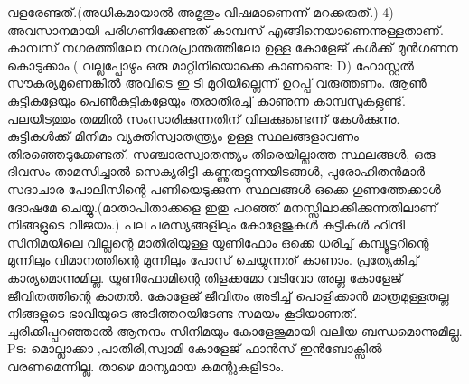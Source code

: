 \documentclass[10pt,a4paper]{report}
\begin{document}
വളരേണ്ടത്.(അധികമായാൽ അമൃതും വിഷമാണെന്ന് മറക്കരുത്.) 4) അവസാനമായി പരിഗണിക്കേണ്ടത് കാമ്പസ് എങ്ങിനെയാണെന്നുള്ളതാണ്. കാമ്പസ് നഗരത്തിലോ നഗരപ്രാന്തത്തിലോ ഉള്ള കോളേജ് കൾക്ക് മുൻഗണന കൊടുക്കാം ( വല്ലപ്പോഴും ഒരു മാറ്റിനിയൊക്കെ കാണണ്ടെ: D) ഹോസ്റ്റൽ സൗകര്യമുണെങ്കിൽ അവിടെ ഇ ടി മുറിയില്ലെന്ന് ഉറപ്പ് വരുത്തണം. ആൺ കുട്ടികളേയും പെൺകുട്ടികളേയും തരാതിരച്ച് കാണുന്ന കാമ്പസുകളുണ്ട്. പലയിടത്തും തമ്മിൽ സംസാരിക്കുന്നതിന് വിലക്കുണ്ടെന്ന് കേൾക്കുന്നു. കുട്ടികൾക്ക് മിനിമം വ്യക്തിസ്വാതന്ത്ര്യം ഉള്ള സ്ഥലങ്ങളാവണം തിരഞ്ഞെടുക്കേണ്ടത്. സഞ്ചാരസ്വാതന്ത്യം തിരെയില്ലാത്ത സ്ഥലങ്ങൾ, ഒരു ദിവസം താമസിച്ചാൽ സെക്യരിട്ടി കണ്ണുരുട്ടുന്നയിടങ്ങൾ, പുരോഹിതൻമാർ സദാചാര പോലിസിന്റെ പണിയെടുക്കുന്ന സ്ഥലങ്ങൾ ഒക്കെ ഗുണത്തേക്കാൾ ദോഷമേ ചെയ്യു.(മാതാപിതാക്കളെ ഇതു പറഞ്ഞ് മനസ്സിലാക്കിക്കുന്നതിലാണ് നിങ്ങളുടെ വിജയം.) പല പരസ്യങ്ങളിലും കോളേജുകൾ കുട്ടികൾ ഹിന്ദി സിനിമയിലെ വില്ലന്റെ മാതിരിയുള്ള യൂണിഫോം ഒക്കെ ധരിച്ച് കമ്പ്യൂട്ടറിന്റെ മുന്നിലും വിമാനത്തിന്റെ മുന്നിലും പോസ് ചെയ്യുന്നത് കാണാം. പ്രത്യേകിച്ച് കാര്യമൊന്നുമില്ല. യൂണിഫോമിന്റെ തിളക്കമോ വടിവോ അല്ല കോളേജ് ജീവിതത്തിന്റെ കാതൽ. കോളേജ് ജീവിതം അടിച്ച് പൊളിക്കാൻ മാത്രമുള്ളതല്ല നിങ്ങളുടെ ഭാവിയുടെ അടിത്തറയിടേണ്ട സമയം കൂടിയാണത്. ചുരിക്കിപ്പറഞ്ഞാൽ ആനന്ദം സിനിമയും കോളേജുമായി വലിയ ബന്ധമൊന്നുമില്ല. Pട: മൊല്ലാക്കാ ,പാതിരി,സ്വാമി കോളേജ് ഫാൻസ് ഇൻബോക്സിൽ വരണമെന്നില്ല. താഴെ മാന്യമായ കമന്റുകളിടാം.
  
\end{document}
